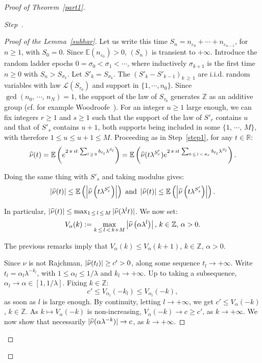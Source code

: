 \documentclass[10pt]{amsart}
\theoremstyle{definition}\newtheorem{defi}[theo]{Definition}\newtheorem{rema}[theo]{Remark}\newtheorem{exam}[theo]{Example}\newtheorem{exem}[theo]{Example}\newtheorem{nota}[theo]{Notation}
\newcommand{\Ebb}{\mathbb E}
\newcommand{\Rbb}{\mathbb R}
\newcommand{\Zbb}{\mathbb Z}
\newcommand{\Lcl}{\mathcal{L}}
\newcounter{stepcount}
\newenvironment{step}{\refstepcounter{stepcount}\begin{proof}[Step~\thestepcount]}{\let\qed\relax\end{proof}}
\let\oldhat\hat
\renewcommand*{\hat}[1]{\mathchoice{\widehat{#1}}{\widehat{#1}}{\oldhat{#1}}{\oldhat{#1}}}
\begin{document}
\begin{proof}[{Proof of Theorem~\ref{part1}}]
\begin{step}
\begin{proof}[{Proof of the Lemma~\ref{subhar}}]
Let us write this time $S_n=n_{\varepsilon_0}+\cdots+n_{\varepsilon_{n-1}}$, for $n\geq1$, with $S_0=0$. Since $\Ebb(n_{\varepsilon_0})>0$, $(S_n)$ is transient to $+\infty$. Introduce the random ladder epochs $0=\sigma_0<\sigma_1<\cdots$, where inductively $\sigma_{k+1}$ is the first time $n\geq0$ with $S_n>S_{\sigma_{k}}$. Let $S'_k=S_{\sigma_{k}}$. The $(S'_k-S'_{k-1})_{k\,\geq\,1}$ are i.i.d. random variables with law ${\Lcl}(S_{\tau_0})$ and support in $\{1,\cdots,n_0\}$. Since $\gcd(n_0,\,\cdots,\,n_N)=1$, the support of the law of $S_{\tau_0}$ generates $\Zbb$ as an additive group (cf. for example Woodroofe~\cite[Theorem~2.3, second~part]{wood}). For an integer $u\geq1$ large enough, we can fix integers $r\geq1$ and $s\geq1$ such that the support of the law of $S'_r$ contains $u$ and that of $S'_s$ contains $u+1$, both supports being included in some $\{1,\,\cdots,\,M\}$, with therefore $1\leq u\leq u+1\leq M$. Proceeding as in Step~\ref{step1}, for any $t\in\Rbb$:
\[
\hat{\nu}(t)=\Ebb\left({e^{2\,\pi\,it\,\sum_{l\,\geq\,0}b_{\varepsilon_l}\lambda^{S_l}}}\right)=\Ebb\left({\hat{\nu}(t\lambda^{S'_{r}})e^{2\,\pi\,it\,\sum_{0\,\leq\,l\,<\,\sigma_r}b_{\varepsilon_l}\lambda^{S_l}}}\right).
\]

Doing the same thing with $S'_s$ and taking modulus gives:
\begin{equation}\label{itera}
\left|\hat{\nu}(t)\right|\leq\Ebb\left({\left|\hat{\nu}\left(t\lambda^{S'_{r}}\right)\right|}\right)\text{ and }\left|\hat{\nu}(t)\right|\leq\Ebb\left({\left|\hat{\nu}\left(t\lambda^{S'_{s}}\right)\right|}\right).
\end{equation}

In particular, $|\hat{\nu}(t)|\leq\max_{1\,\leq\,l\,\leq \,M}|\hat{\nu}(\lambda^lt)|$. We now set:
\[
V_{\alpha}(k):=\max_{k\,\leq\,l\,<\,k+M}\left|\hat{\nu}\left(\alpha\lambda^l\right)\right|,\,k\in\Zbb,\,\alpha>0.
\]

The previous remarks imply that $V_{\alpha}(k)\leq V_{\alpha}(k+1)$, $k\in\Zbb$, $\alpha>0$.

Since $\nu$ is not Rajchman, $|\hat{\nu}(t_l)|\geq c'>0$, along some sequence $t_l\rightarrow+\infty$. Write $t_l=\alpha_l\lambda^{-k_l}$, with $1\leq \alpha_l\leq 1/\lambda$ and $k_l\rightarrow+\infty$. Up to taking a subsequence, $\alpha_l\rightarrow\alpha\in[1,1/\lambda]$. Fixing $k\in\Zbb$:
\[
c'\leq V_{\alpha_l}(-k_l)\leq V_{\alpha_l}(-k),
\]
as soon as $l$ is large enough. By continuity, letting $l\rightarrow+\infty$, we get $c'\leq V_{\alpha}(-k)$, $k\in\Zbb$. As $k\longmapsto V_{\alpha}(-k)$ is non-increasing, $V_{\alpha}(-k)\rightarrow c\geq c'$, as $k\rightarrow+\infty$. We now show that necessarily $|\hat{\nu}(\alpha\lambda^{-k})|\rightarrow c$, as $k\rightarrow+\infty$.


\end{proof}
\end{step}
\end{proof}
\end{document}
